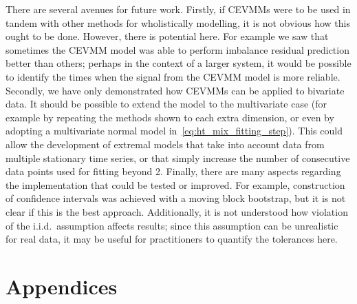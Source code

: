 \documentclass[11pt,twoside,openany]{book}
\numberwithin{Theorem}{chapter}
\numberwithin{Definition}{chapter}
\numberwithin{Lemma}{chapter}
\numberwithin{Algorithm}{chapter}
\numberwithin{equation}{chapter}
\begin{document}


There are several avenues for future work. Firstly, if CEVMMs were to be used
in tandem with other methods for wholistically modelling,
it is not obvious how this ought to be done. However, there is potential here.
For example we saw that sometimes the CEVMM model was able to perform imbalance
residual prediction better than others; perhaps in the context of a larger
system, it would be possible to identify the times when the signal from the
CEVMM model is more reliable. Secondly, we have only demonstrated how CEVMMs
can be applied to bivariate data. It should be possible to extend the model to
the multivariate case (for example by repeating the methods shown to each extra
dimension, or even by adopting a multivariate normal model
in~\eqref{eq:ht_mix_fitting_step}). This could allow the development of
extremal models that take into account data from multiple stationary time
series, or that simply increase the number of consecutive data points used for
fitting beyond 2. Finally, there are many aspects regarding the implementation
that could be tested or improved. For example, construction of confidence
intervals was achieved with a moving block bootstrap, but it is not clear if
this is the best approach. Additionally, it is not understood how violation of
the i.i.d.\ assumption affects results; since this assumption can be
unrealistic for real data, it may be useful for practitioners to quantify the
tolerances here.








\appendix
\chapter{Appendices}

\end{document}

